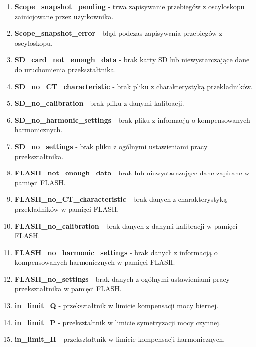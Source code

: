 \documentclass[12pt,a4paper]{article}
\begin{document}
\begin{enumerate}
	\item \textbf{Scope\_snapshot\_pending} - trwa zapisywanie przebiegów z oscyloskopu zainicjowane przez użytkownika.
	
	\item \textbf{Scope\_snapshot\_error} - błąd podczas zapisywania przebiegów z oscyloskopu.

	\item \textbf{SD\_card\_not\_enough\_data} - brak karty SD lub niewystarczające dane do uruchomienia przekształtnika.
	
	\item \textbf{SD\_no\_CT\_characteristic} - brak pliku z charakterystyką przekładników.
	
	\item \textbf{SD\_no\_calibration} - brak pliku z danymi kalibracji.
	
	\item \textbf{SD\_no\_harmonic\_settings} - brak pliku z informacją o kompensowanych harmonicznych.
	
	\item \textbf{SD\_no\_settings} - brak pliku z ogólnymi ustawieniami pracy przekształtnika.
		
	\item \textbf{FLASH\_not\_enough\_data} - brak lub niewystarczające dane zapisane w pamięci FLASH.
	
	\item \textbf{FLASH\_no\_CT\_characteristic} - brak danych z charakterystyką przekładników w pamięci FLASH.

	\item \textbf{FLASH\_no\_calibration} - brak danych z danymi kalibracji w pamięci FLASH.

	\item \textbf{FLASH\_no\_harmonic\_settings} - brak danych z informacją o kompensowanych harmonicznych w pamięci FLASH.

	\item \textbf{FLASH\_no\_settings} - brak danych z ogólnymi ustawieniami pracy przekształtnika w pamięci FLASH.

	\item \textbf{in\_limit\_Q} - przekształtnik w limicie kompensacji mocy biernej.
	
	\item \textbf{in\_limit\_P} - przekształtnik w limicie symetryzacji mocy czynnej.
	
	\item \textbf{in\_limit\_H} - przekształtnik w limicie kompensacji harmonicznych.
	

\end{enumerate}
\end{document}
